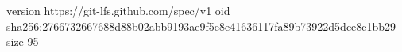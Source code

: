 version https://git-lfs.github.com/spec/v1
oid sha256:2766732667688d88b02abb9193ae9f5e8e41636117fa89b73922d5dce8e1bb29
size 95
